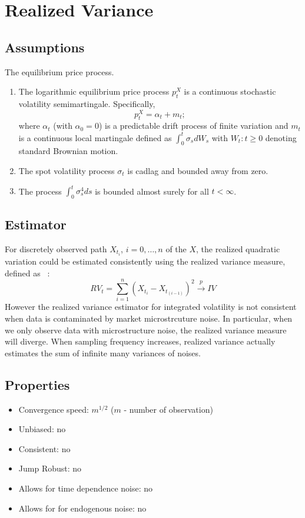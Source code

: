 \documentclass[letterpaper]{report}
\begin{document}
\section{Realized Variance}
\subsection{Assumptions}
The equilibrium price process.
\begin{enumerate}
\item The logarithmic equilibrium price process $p_t^X$
is a continuous stochastic volatility semimartingale. Specifically,
\begin{equation}
p_t^X = \alpha_t + m_t;
\end{equation}
where $\alpha_t$ (with $\alpha_0 =0$) is a predictable drift process of
finite variation and $m_t$ is a continuous local martingale defined as
$\int_0^t\sigma_s dW_s$ with ${W_t: t\geq 0}$ denoting standard Brownian motion.
\item The spot volatility process $\sigma_t$ is cadlag and bounded away from
zero.
\item The process $\int_0^t\sigma_s^4ds$ is bounded almost surely for all $t <
\infty$.
\end{enumerate}
\subsection{Estimator}
For discretely observed path $X_{t_i}$, $i = 0,\ldots, n$ of the $X$, the
realized quadratic variation could be estimated consistently using the realized
variance measure, defined as ~\cite[Zu and Boswijk, 2008]{Zu_Boswijk}:
\begin{equation}
RV_t=\sum_{i=1}^n (X_{t_i}-X_{t_{(i-1)}})^2 \stackrel{p}{\to} IV
\end{equation}
However the realized variance estimator for integrated volatility is not consistent when data is
contaminated by market microstrcuture noise. In particular, when we only observe
data with microstructure noise, the realized variance measure will
diverge. When sampling frequency increases, realized variance actually estimates
the sum of infinite many variances of noises.
\subsection{Properties}
\begin{itemize}
\item Convergence speed: $m^{1/2}$ ($m$ - number of observation)
\item Unbiased: no
\item Consistent: no
\item Jump Robust: no
\item Allows for time dependence noise: no
\item Allows for for endogenous noise: no
\end{itemize}
 
\end{document}
